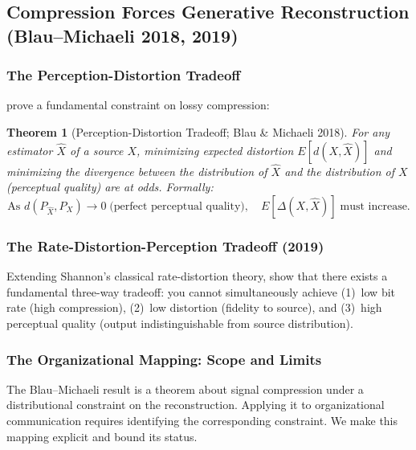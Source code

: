\documentclass[12pt,letterpaper]{article}
\newtheorem{theorem}{Theorem}[section]
\theoremstyle{definition}
\theoremstyle{remark}
\begin{document}
\subsection{Compression Forces Generative Reconstruction (Blau--Michaeli 2018, 2019)}
\label{sec:blaumichaeli}

\subsubsection{The Perception-Distortion Tradeoff}

\citet{blau2018} prove a fundamental constraint on lossy compression:

\begin{theorem}[Perception-Distortion Tradeoff; Blau \& Michaeli 2018]
For any estimator $\hat{X}$ of a source $X$, minimizing expected distortion $E[d(X, \hat{X})]$ and minimizing the divergence between the distribution of $\hat{X}$ and the distribution of $X$ (perceptual quality) are at odds. Formally:
\begin{equation}
\text{As } d(P_{\hat{X}}, P_X) \to 0 \;\text{(perfect perceptual quality)}, \quad E[\Delta(X, \hat{X})] \;\text{must increase.}
\end{equation}
\end{theorem}

\subsubsection{The Rate-Distortion-Perception Tradeoff (2019)}

Extending Shannon's classical rate-distortion theory, \citet{blau2019} show that there exists a fundamental three-way tradeoff: you cannot simultaneously achieve (1)~low bit rate (high compression), (2)~low distortion (fidelity to source), and (3)~high perceptual quality (output indistinguishable from source distribution).

\subsubsection{The Organizational Mapping: Scope and Limits}

The Blau--Michaeli result is a theorem about signal compression under a distributional constraint on the reconstruction. Applying it to organizational communication requires identifying the corresponding constraint. We make this mapping explicit and bound its status.
\end{document}
